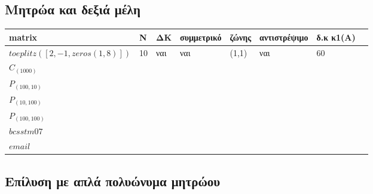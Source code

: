 \documentclass{article}
\begin{document}
\subsection{Μητρώα και δεξιά μέλη}
\begin{tabular}{ |p{4.5cm}||p{1cm}|p{1cm}|p{2cm}|p{1cm}|p{2cm}|p{2cm}|p{1cm}|}
    \hline
    matrix & N & ΔΚ & συμμετρικό & ζώνης & αντιστρέψιμο & δ.κ κ1(Α)\\
    \hline
    $toeplitz([2, -1, zeros(1,8)])$ & 10 & ναι & ναι & (1,1) & ναι & 60\\
    \hline
    $C_{(1000)}$&&&&&&\\
    \hline
    $P_{(100,10)}$&&&&&&\\
    \hline
    $P_{(10,100)}$&&&&&&\\
    \hline
    $P_{(100,100)}$&&&&&&\\
    \hline
    $bcsstm07$ &&&&&&\\
    \hline
    $email$&&&&&&\\
    \hline
   \end{tabular}
\subsection{Επίλυση με απλά πολυώνυμα μητρώου}
\end{document}
